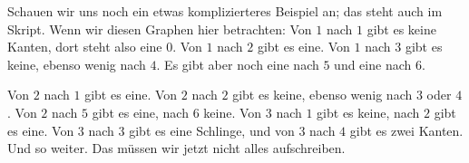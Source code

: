 \begin{spoken-clean}[00:32:57 - 00:34:42]
Schauen wir uns noch ein etwas komplizierteres Beispiel an; das steht auch im Skript. Wenn wir diesen Graphen hier betrachten: Von $1$ nach $1$ gibt es keine Kanten, dort steht also eine $0$. Von $1$ nach $2$ gibt es eine. Von $1$ nach $3$ gibt es keine, ebenso wenig nach $4$. Es gibt aber noch eine nach $5$ und eine nach $6$.

Von $2$ nach $1$ gibt es eine. Von $2$ nach $2$ gibt es keine, ebenso wenig nach $3$ oder $4$. Von $2$ nach $5$ gibt es eine, nach $6$ keine. Von $3$ nach $1$ gibt es keine, nach $2$ gibt es eine. Von $3$ nach $3$ gibt es eine Schlinge, und von $3$ nach $4$ gibt es zwei Kanten. Und so weiter. Das müssen wir jetzt nicht alles aufschreiben.
\end{spoken-clean}

